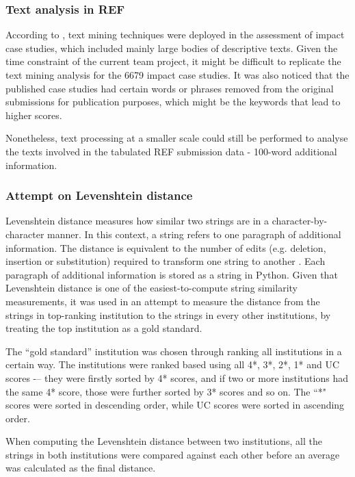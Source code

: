 \documentclass[a4paper, 11pt]{article}
\begin{document}
\subsubsection{Text analysis in REF}

According to \citet*{HEFCE_impact}, text mining techniques were deployed in the assessment of impact case studies, which included mainly large bodies of descriptive texts. Given the time constraint of the current team project, it might be difficult to replicate the text mining analysis for the 6679 impact case studies. It was also noticed that the published case studies had certain words or phrases removed from the original submissions for publication purposes, which might be the keywords that lead to higher scores. 

Nonetheless, text processing at a smaller scale could still be performed to analyse the texts involved in the tabulated REF submission data - 100-word additional information.

\subsubsection{Attempt on Levenshtein distance}

Levenshtein distance measures how similar two strings are in a character-by-character manner. In this context, a string refers to one paragraph of additional information. The distance is equivalent to the number of edits (e.g. deletion, insertion or substitution) required to transform one string to another \citep{Lev}. Each paragraph of additional information is stored as a string in Python. Given that Levenshtein distance is one of the easiest-to-compute string similarity measurements, it was used in an attempt to measure the distance from the strings in top-ranking institution to the strings in every other institutions, by treating the top institution as a gold standard. 

The ``gold standard'' institution was chosen through ranking all institutions in a certain way. The institutions were ranked based using all 4*, 3*, 2*, 1* and UC scores -– they were firstly sorted by 4* scores, and if two or more institutions had the same 4* score, those were further sorted by 3* scores and so on. The ``*" scores were sorted in descending order, while UC scores were sorted in ascending order. 

When computing the Levenshtein distance between two institutions, all the strings in both institutions were compared against each other before an average was calculated as the final distance.
\end{document}
